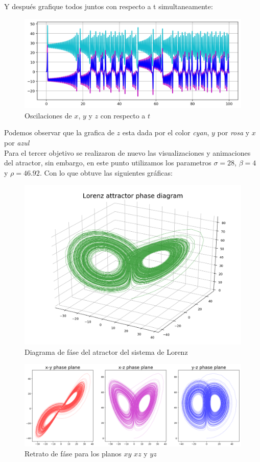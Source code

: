 \documentclass{article}
\begin{document}
\newpage

Y después grafique todos juntos con respecto a t simultaneamente:

\begin{figure}[ht!]
\centering
\includegraphics[width=\linewidth]{oMixed-t.png}
\caption{Oscilaciones de $x$, $y$ y $z$ con respecto a $t$}
\end{figure}

Podemos observar que la grafica de $z$ esta dada por el color \textit{cyan}, $y$ por \textit{rosa} y $x$ por \textit{azul}
~\\

Para el tercer objetivo se realizaron de nuevo las visualizaciones y animaciones del atractor, sin embargo, en este punto utilizamos los parametros $\sigma=28$, $\beta=4$ y $\rho=46.92$. Con lo que obtuve las siguientes gráficas:
\begin{figure}[ht!]
\centering
\includegraphics[width=0.5\linewidth]{ej3-pd.png}
\caption{Diagrama de fáse del atractor del sistema de Lorenz}
\end{figure}

\begin{figure}[ht!]
\centering
\includegraphics[width=\linewidth]{ej3-pp.png}
\caption{Retrato de fáse para los planos $xy$ $xz$ y $yz$}
\end{figure}
\end{document}
